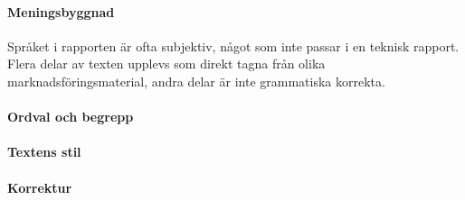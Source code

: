     \paragraph{Meningsbyggnad}
        Språket i rapporten är ofta subjektiv, något som inte passar i en teknisk rapport. Flera delar av texten upplevs som direkt tagna från olika marknadsföringsmaterial, andra delar är inte grammatiska korrekta.

    \paragraph{Ordval och begrepp}

    \paragraph{Textens stil}

    \paragraph{Korrektur}


